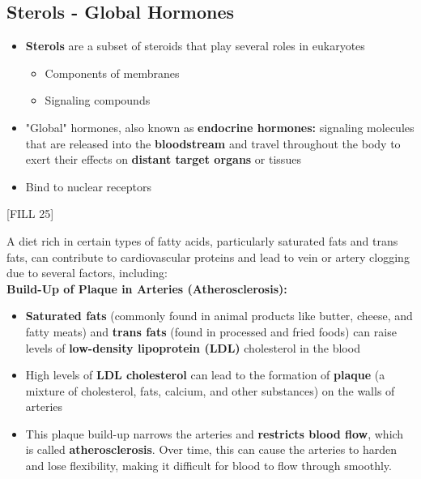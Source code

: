 \documentclass[10pt]{article}
\begin{document}
\subsection*{Sterols - Global Hormones}
\begin{itemize}
    \item \textbf{Sterols} are a subset of steroids that play several roles in eukaryotes
    \begin{itemize}
        \item Components of membranes
        \item Signaling compounds
    \end{itemize}
    \item "Global" hormones, also known as \textbf{endocrine hormones:} signaling molecules that are released into the \textbf{bloodstream} and travel throughout the body to exert their effects on \textbf{distant target organs} or tissues
    \item Bind to nuclear receptors
\end{itemize}
\begin{center}
    [FILL 25]
\end{center}
A diet rich in certain types of fatty acids, particularly saturated fats and trans fats, can contribute to cardiovascular proteins and lead to vein or artery clogging due to several factors, including:\\
\textbf{Build-Up of Plaque in Arteries (Atherosclerosis):}
\begin{itemize}
    \item \textbf{Saturated fats} (commonly found in animal products like butter, cheese, and fatty meats) and \textbf{trans fats} (found in processed and fried foods) can raise levels of \textbf{low-density lipoprotein (LDL)} cholesterol in the blood
    \item High levels of \textbf{LDL cholesterol} can lead to the formation of \textbf{plaque} (a mixture of cholesterol, fats, calcium, and other substances) on the walls of arteries
    \item This plaque build-up narrows the arteries and \textbf{restricts blood flow}, which is called \textbf{atherosclerosis}.  Over time, this can cause the arteries to harden and lose flexibility, making it difficult for blood to flow through smoothly.
\end{itemize}
\end{document}
